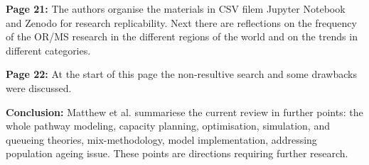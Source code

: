     \textbf{Page 21:}
    The authors organise the materials in CSV filem Jupyter Notebook and Zenodo for research replicability. Next there are reflections on the frequency of the OR/MS research in the different regions of the world and on the trends in different categories.

    \textbf{Page 22:}
    At the start of this page the non-resultive search and some drawbacks were discussed.

    \textbf{Conclusion:}
    Matthew et al. summariese the current review in further points: the whole pathway modeling, capacity planning, optimisation, simulation, and queueing theories, mix-methodology, model implementation, addressing population ageing issue. These points are directions requiring further research.